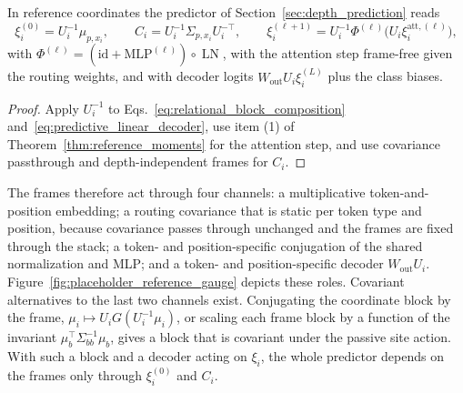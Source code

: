 \documentclass[twoside,11pt]{article}
\begin{document}
\begin{corollary}
\label{cor:normal_form}
In reference coordinates the predictor of Section~\ref{sec:depth_prediction} reads
\begin{equation}
\xi_i^{(0)}=U_i^{-1}\mu_{p,x_i},\qquad
C_i=U_i^{-1}\Sigma_{p,x_i}U_i^{-\top},\qquad
\xi_i^{(\ell+1)}=U_i^{-1}\Phi^{(\ell)}\bigl(U_i\xi_i^{\mathrm{att},(\ell)}\bigr),
\label{eq:reference_normal_form}
\end{equation}
with $\Phi^{(\ell)}=(\mathrm{id}+\mathrm{MLP}^{(\ell)})\circ\operatorname{LN}$, with the attention step frame-free given the routing weights, and with decoder logits $W_{\mathrm{out}}U_i\xi_i^{(L)}$ plus the class biases.
\end{corollary}
\begin{proof}
Apply $U_i^{-1}$ to Eqs.~\eqref{eq:relational_block_composition} and~\eqref{eq:predictive_linear_decoder}, use item (1) of Theorem~\ref{thm:reference_moments} for the attention step, and use covariance passthrough and depth-independent frames for $C_i$.
\end{proof}
The frames therefore act through four channels: a multiplicative token-and-position embedding; a routing covariance that is static per token type and position, because covariance passes through unchanged and the frames are fixed through the stack; a token- and position-specific conjugation of the shared normalization and MLP; and a token- and position-specific decoder $W_{\mathrm{out}}U_i$. Figure~\ref{fig:placeholder_reference_gauge} depicts these roles. Covariant alternatives to the last two channels exist. Conjugating the coordinate block by the frame, $\mu_i\mapsto U_iG(U_i^{-1}\mu_i)$, or scaling each frame block by a function of the invariant $\mu_b^\top\Sigma_{bb}^{-1}\mu_b$, gives a block that is covariant under the passive site action. With such a block and a decoder acting on $\xi_i$, the whole predictor depends on the frames only through $\xi_i^{(0)}$ and $C_i$.
\end{document}
